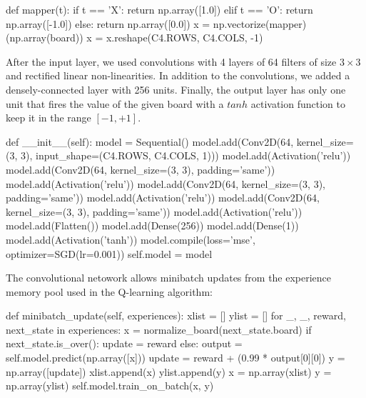\documentclass{article}
\begin{document}
\begin{python}
def mapper(t):
    if t == 'X':
        return np.array([1.0])
    elif t == 'O':
        return np.array([-1.0])
    else:
        return np.array([0.0])
x = np.vectorize(mapper)(np.array(board))
x = x.reshape(C4.ROWS, C4.COLS, -1)
\end{python}

After the input layer, we used convolutions with 4 layers of 64 filters of size $3\times3$ and
rectified linear non-linearities. In addition to the convolutions, we added a densely-connected
layer with 256 units. Finally, the output layer has only one unit that fires the value of the given
board with a $tanh$ activation function to keep it in the range $[-1, +1]$.

\begin{python}
    def __init__(self):
        model = Sequential()
        model.add(Conv2D(64, kernel_size=(3, 3), input_shape=(C4.ROWS, C4.COLS, 1)))
        model.add(Activation('relu'))
        model.add(Conv2D(64, kernel_size=(3, 3), padding='same'))
        model.add(Activation('relu'))
        model.add(Conv2D(64, kernel_size=(3, 3), padding='same'))
        model.add(Activation('relu'))
        model.add(Conv2D(64, kernel_size=(3, 3), padding='same'))
        model.add(Activation('relu'))
        model.add(Flatten())
        model.add(Dense(256))
        model.add(Dense(1))
        model.add(Activation('tanh'))
        model.compile(loss='mse', optimizer=SGD(lr=0.001))
        self.model = model
\end{python}

The convolutional netowork allows minibatch updates from the experience memory pool used in the
Q-learning algorithm:

\begin{python}
    def minibatch_update(self, experiences):
        xlist = []
        ylist = []
        for _, _, reward, next_state in experiences:
            x = normalize_board(next_state.board)
            if next_state.is_over():
                update = reward
            else:
                output = self.model.predict(np.array([x]))
                update = reward + (0.99 * output[0][0])
            y = np.array([update])
            xlist.append(x)
            ylist.append(y)
        x = np.array(xlist)
        y = np.array(ylist)
        self.model.train_on_batch(x, y)
\end{python}

\pagebreak[4]

\end{document}
